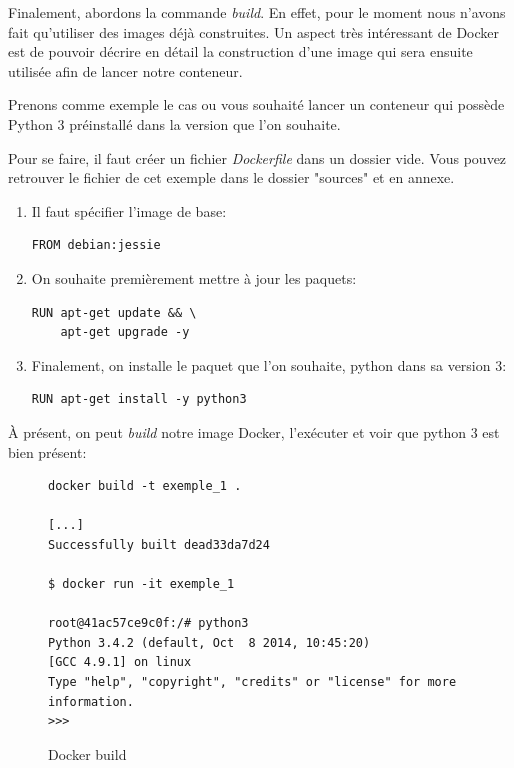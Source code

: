 Finalement, abordons la commande \emph{build}. En effet, pour le moment nous n'avons fait qu'utiliser des images déjà construites. Un aspect très intéressant de Docker est de pouvoir décrire en détail la construction d'une image qui sera ensuite utilisée afin de lancer notre conteneur.

Prenons comme exemple le cas ou vous souhaité lancer un conteneur qui possède Python 3 préinstallé dans la version que l'on souhaite.

Pour se faire, il faut créer un fichier \emph{Dockerfile} dans un dossier vide. Vous pouvez retrouver le fichier de cet exemple dans le dossier "sources" et en annexe.

\begin{enumerate}
\item Il faut spécifier l'image de base:
\begin{lstlisting}[frame=single]
FROM debian:jessie
\end{lstlisting}

\item On souhaite premièrement mettre à jour les paquets:
\begin{lstlisting}[frame=single]
RUN apt-get update && \
    apt-get upgrade -y
\end{lstlisting}

\item Finalement, on installe le paquet que l'on souhaite, python dans sa version 3:
\begin{lstlisting}[frame=single]
RUN apt-get install -y python3
\end{lstlisting}

\end{enumerate}

À présent, on peut \emph{build} notre image Docker, l'exécuter et voir que python 3 est bien présent:

\begin{figure}[H] 
\centering 
\begin{lstlisting}[frame=single]
docker build -t exemple_1 .

[...]
Successfully built dead33da7d24

$ docker run -it exemple_1

root@41ac57ce9c0f:/# python3
Python 3.4.2 (default, Oct  8 2014, 10:45:20) 
[GCC 4.9.1] on linux
Type "help", "copyright", "credits" or "license" for more information.
>>> 

\end{lstlisting}
\caption[Docker build]{Docker build}
\label{fig:dockerBuild} 
\end{figure}

